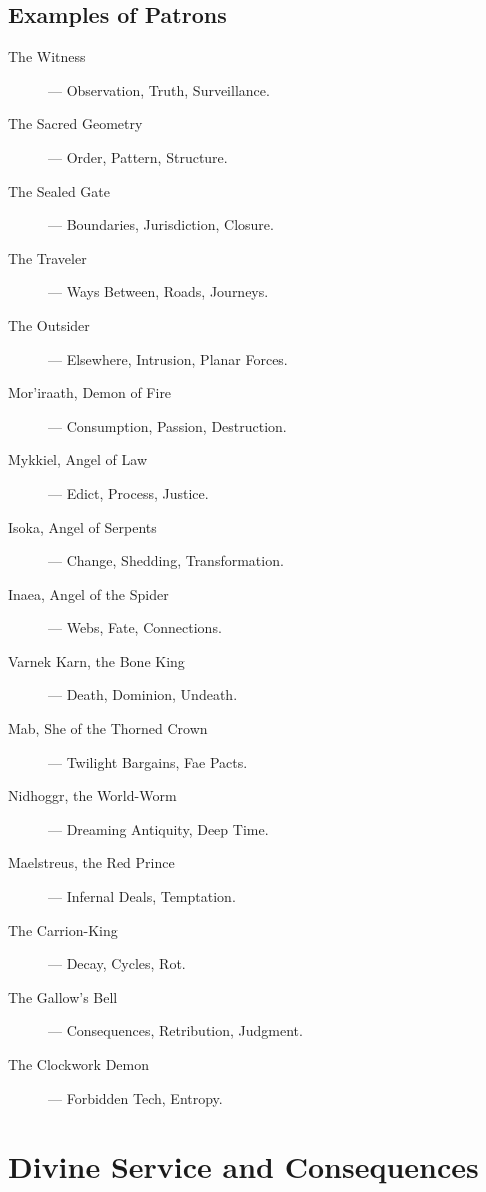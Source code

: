 \subsection*{Examples of Patrons}
\begin{description}
    \item[The Witness]  — Observation, Truth, Surveillance.
    \item[The Sacred Geometry]  — Order, Pattern, Structure.
    \item[The Sealed Gate]  — Boundaries, Jurisdiction, Closure.
    \item[The Traveler]  — Ways Between, Roads, Journeys.
    \item[The Outsider]  — Elsewhere, Intrusion, Planar Forces.
    \item[Mor’iraath, Demon of Fire]  — Consumption, Passion, Destruction.
    \item[Mykkiel, Angel of Law]  — Edict, Process, Justice.
    \item[Isoka, Angel of Serpents]  — Change, Shedding, Transformation.
    \item[Inaea, Angel of the Spider]  — Webs, Fate, Connections.
    \item[Varnek Karn, the Bone King]  — Death, Dominion, Undeath.
    \item[Mab, She of the Thorned Crown]  — Twilight Bargains, Fae Pacts.
    \item[Nidhoggr, the World-Worm]  — Dreaming Antiquity, Deep Time.
    \item[Maelstreus, the Red Prince]  — Infernal Deals, Temptation.
    \item[The Carrion-King]  — Decay, Cycles, Rot.
    \item[The Gallow’s Bell]  — Consequences, Retribution, Judgment.
    \item[The Clockwork Demon]  — Forbidden Tech, Entropy.
\end{description}

\section{Divine Service and Consequences}

